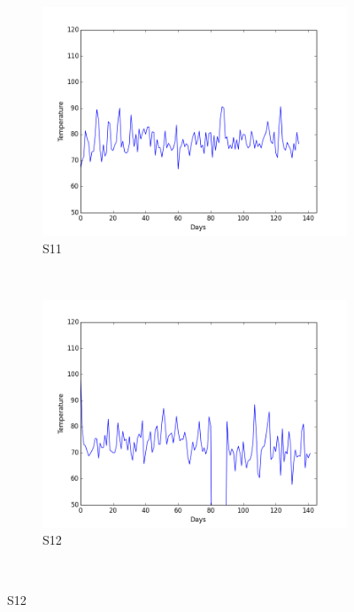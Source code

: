 \documentclass[12pt]{article} %
\begin{document}
\begin{figure}[H]
    \centering
    \begin{subfigure}[b]{0.30\textwidth}
        \includegraphics[width=\textwidth]{img/graphs/11-heartrate-1}
        \caption{S11}
        \label{fig:s11HT}
    \end{subfigure}
    ~ %
    \begin{subfigure}[b]{0.30\textwidth}
        \includegraphics[width=\textwidth]{img/graphs/12-heartrate-1}
        \caption{S12}
        \label{fig:s12HT}
    \end{subfigure}
    ~ %

\end{figure}
\end{document}

